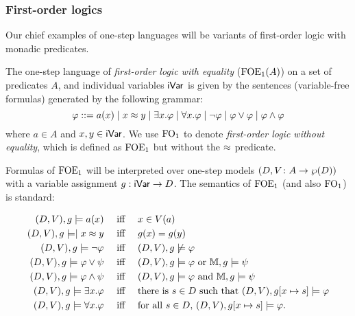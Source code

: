 \subsubsection{First-order logics}

Our chief examples of one-step languages will be variants of first-order logic with monadic predicates.

\begin{definition}
The one-step language of \emph{first-order logic with equality} ($\mathrm{FOE}_1(A)$) on a set of predicates $A$, and individual variables $\mathsf{iVar}$ is given by the sentences (variable-free formulas) generated by the following grammar:\[
\varphi ::= a(x) \mid x \approx y \mid \exists x.\varphi \mid \forall x.\varphi \mid \lnot\varphi \mid \varphi \lor \varphi \mid \varphi \land \varphi
\]
where $a \in A$ and $x,y\in\mathsf{iVar}$. We use $\mathrm{FO}_1$ to denote \emph{first-order logic without equality}, which is defined as $\mathrm{FOE}_1$ but without the $\approx$ predicate.
\end{definition}

Formulas of $\mathrm{FOE}_1$ will be interpreted over one-step models $(D,V \colon A \to \wp(D))$ with a variable assignment $g: \mathsf{iVar} \to D$. The semantics of $\mathrm{FOE}_1$ (and also $\mathrm{FO}_1$) is standard:
%

\begin{align*}
(D, \val),\ass \models a(x) & \quad\text{ iff }\quad  x \in \val(a) \\
(D, \val),\ass \models \mid x \foeq y & \quad\text{ iff }\quad \ass(x) = \ass(y) \\
(D, \val),\ass \models \lnot\varphi & \quad\text{ iff }\quad  (D, \val),\ass \not\models \varphi \\
(D, \val),\ass \models \varphi\lor\psi & \quad\text{ iff }\quad  (D, \val),\ass \models \varphi \text{ or } \npmodel,\ass \models \psi \\
(D, \val),\ass \models \varphi\land\psi & \quad\text{ iff }\quad  (D, \val),\ass \models \varphi \text{ and } \npmodel,\ass \models \psi \\
(D, \val),\ass \models \exists x.\varphi & \quad\text{ iff }\quad  \text{there is $s \in D$ such that $(D, \val), \ass[x\mapsto s] \models \varphi$}\\
(D, \val),\ass \models \forall x.\varphi & \quad\text{ iff }\quad  \text{for all $s \in D$, } (D, \val), \ass[x\mapsto s] \models \varphi.
\end{align*}

